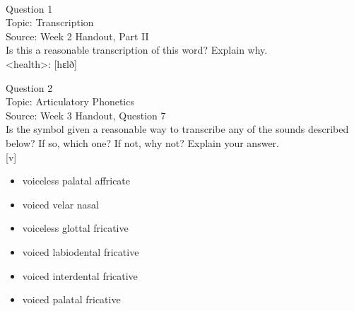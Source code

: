 \documentclass[12pt]{article}
\begin{document}
\newpage

\begin{center}
\textbf{{\color{red}{\HUGE END OF EXAM}}}\\

\end{center}
\newpage

\begin{center}
\textbf{{\color{blue}{\HUGE START OF EXAM\\}}}

\textbf{{\color{blue}{\HUGE Student ID: 70875\\}}}

\textbf{{\color{blue}{\HUGE \\}}}

\end{center}
\newpage

{\large Question 1}\\

Topic: Transcription\\
Source: Week 2 Handout, Part II\\

Is this a reasonable transcription of this word? Explain why.\\

<health>: {[hɛlð]}


\newpage

{\large Question 2}\\

Topic: Articulatory Phonetics\\
Source: Week 3 Handout, Question 7\\

Is the symbol given a reasonable way to transcribe any of the sounds described below? If so, which one? If not, why not? Explain your answer.\\

{[v]}

\begin{itemize} \item voiceless palatal affricate \item voiced velar nasal \item voiceless glottal fricative \item voiced labiodental fricative \item voiced interdental fricative \item voiced palatal fricative \end{itemize}


\newpage
\end{document}
